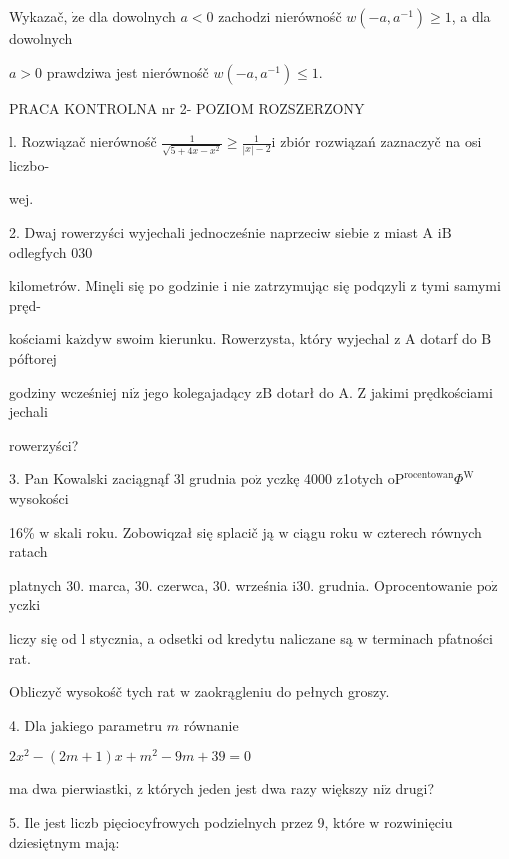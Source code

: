 \documentclass[a4paper,12pt]{article}
\begin{document}
Wykazač, $\dot{\mathrm{z}}\mathrm{e}$ dla dowolnych $a<0$ zachodzi nierównośč $w(-a,a^{-1})\geq 1$, a dla dowolnych

$a>0$ prawdziwa jest nierównośč $w(-a,a^{-1})\leq 1.$





PRACA KONTROLNA nr 2- POZIOM ROZSZERZONY

l. Rozwiązač nierównośč $\displaystyle \frac{1}{\sqrt{5+4x-x^{2}}}\geq\frac{1}{|x|-2}\mathrm{i}$ zbiór rozwiązań zaznaczyč na osi liczbo-

wej.

2. Dwaj rowerzyści wyjechali jednocześnie naprzeciw siebie $\mathrm{z}$ miast A $\mathrm{i}\mathrm{B}$ odlegfych $030$

kilometrów. Minęli się po godzinie $\mathrm{i}$ nie zatrzymując się podqzyli $\mathrm{z}$ tymi samymi pręd-

kościami $\mathrm{k}\mathrm{a}\dot{\mathrm{z}}\mathrm{d}\mathrm{y}\mathrm{w}$ swoim kierunku. Rowerzysta, który wyjechal $\mathrm{z}$ A dotarf do $\mathrm{B}$ póftorej

godziny wcześniej $\mathrm{n}\mathrm{i}\dot{\mathrm{z}}$ jego kolegajadący $\mathrm{z}\mathrm{B}$ dotarł do A. $\mathrm{Z}$ jakimi prędkościami jechali

rowerzyści?

3. Pan Kowalski zaciągnąf 3l grudnia $\mathrm{p}\mathrm{o}\dot{\mathrm{z}}$ yczkę 4000 z1otych $\mathrm{o}\mathrm{P}^{\mathrm{r}\mathrm{o}\mathrm{c}\mathrm{e}\mathrm{n}\mathrm{t}\mathrm{o}\mathrm{w}\mathrm{a}\mathrm{n}}\Phi^{\mathrm{W}}$ wysokości

16\% $\mathrm{w}$ skali roku. Zobowiqzał się splacič ją $\mathrm{w}$ ciągu roku $\mathrm{w}$ czterech równych ratach

platnych 30. marca, 30. czerwca, 30. września $\mathrm{i}30$. grudnia. Oprocentowanie $\mathrm{p}\mathrm{o}\dot{\mathrm{z}}$ yczki

liczy się od l stycznia, a odsetki od kredytu naliczane są $\mathrm{w}$ terminach pfatności rat.

Obliczyč wysokośč tych rat $\mathrm{w}$ zaokrągleniu do pełnych groszy.

4. Dla jakiego parametru $m$ równanie

$2x^{2}-(2m+1)x+m^{2}-9m+39=0$

ma dwa pierwiastki, $\mathrm{z}$ których jeden jest dwa razy większy $\mathrm{n}\mathrm{i}\dot{\mathrm{z}}$ drugi?

5. Ile jest liczb pięciocyfrowych podzielnych przez 9, które $\mathrm{w}$ rozwinięciu dziesiętnym mają:
\end{document}
